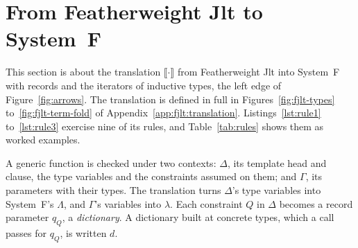 \section{From Featherweight Jlt to System~F}
\label{sec:translation}

This section is about the translation $\llbracket \cdot \rrbracket$ from Featherweight Jlt into System~F with records and the iterators of inductive types, the left edge of Figure~\ref{fig:arrows}.
The translation is defined in full in Figures~\ref{fig:fjlt-types} to~\ref{fig:fjlt-term-fold} of Appendix~\ref{app:fjlt:translation}.
Listings~\ref{lst:rule1} to~\ref{lst:rule3} exercise nine of its rules, and Table~\ref{tab:rules} shows them as worked examples.

A generic function is checked under two contexts: $\Delta$, its template head and  clause, the type variables and the constraints assumed on them; and $\Gamma$, its parameters with their types.
The translation turns $\Delta$'s type variables into System~F's $\Lambda$, and $\Gamma$'s variables into $\lambda$.
Each constraint $Q$ in $\Delta$ becomes a record parameter $q_Q$, a \emph{dictionary}.
A dictionary built at concrete types, which a call passes for $q_Q$, is written $d$.

